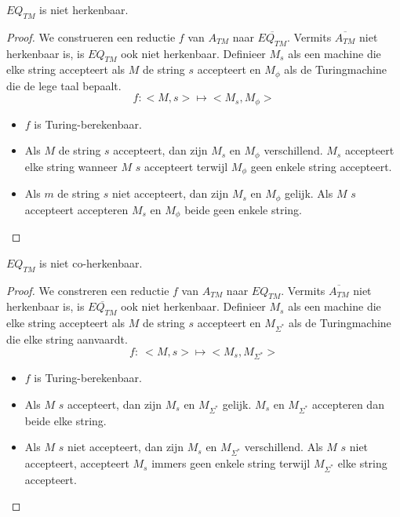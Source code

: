 \documentclass[main.tex]{subfiles}
\begin{document}
\begin{st}
  \label{st:eq-tm-niet-herk}
  $EQ_{TM}$ is niet herkenbaar.

  \begin{proof}
    We construeren een reductie $f$ van $A_{TM}$ naar $\overline{EQ_{TM}}$.
    Vermits $\overline{A_{TM}}$ niet herkenbaar is, is $EQ_{TM}$ ook niet herkenbaar.
    Definieer $M_{s}$ als een machine die elke string accepteert als $M$ de string $s$ accepteert en $M_{\phi}$ als de Turingmachine die de lege taal bepaalt.
    \[ f: <M,s> \mapsto <M_{s},M_{\phi}> \]
    \begin{itemize}
    \item $f$ is Turing-berekenbaar. 
    \item Als $M$ de string $s$ accepteert, dan zijn $M_{s}$ en $M_{\phi}$ verschillend.
      $M_{s}$ accepteert elke string wanneer $M$ $s$ accepteert terwijl $M_{\phi}$ geen enkele string accepteert.
    \item Als $m$ de string $s$ niet accepteert, dan zijn $M_{s}$ en $M_{\phi}$ gelijk.
      Als $M$ $s$ accepteert accepteren $M_{s}$ en $M_{\phi}$ beide geen enkele string.
    \end{itemize}
  \end{proof}
\end{st}

\begin{st}
  \label{st:eq-tm-niet-coherk}
  $EQ_{TM}$ is niet co-herkenbaar.

  \begin{proof}
    We constreren een reductie $f$ van $A_{TM}$ naar $EQ_{TM}$.
    Vermits $\overline{A_{TM}}$ niet herkenbaar is, is $\overline{EQ_{TM}}$ ook niet herkenbaar.
    Definieer $M_{s}$ als een machine die elke string accepteert als $M$ de string $s$ accepteert en $M_{\Sigma^{*}}$ als de Turingmachine die elke string aanvaardt.
    \[ f:\ <M,s> \mapsto <M_{s},M_{\Sigma^{*}}> \]
    \begin{itemize}
    \item $f$ is Turing-berekenbaar. 
    \item Als $M$ $s$ accepteert, dan zijn $M_{s}$ en $M_{\Sigma^{*}}$ gelijk.
      $M_{s}$ en $M_{\Sigma^{*}}$ accepteren dan beide elke string.
    \item Als $M$ $s$ niet accepteert, dan zijn $M_{s}$ en $M_{\Sigma^{*}}$ verschillend.
      Als $M$ $s$ niet accepteert, accepteert $M_{s}$ immers geen enkele string terwijl $M_{\Sigma^{*}}$ elke string accepteert.
    \end{itemize}
  \end{proof}
\end{st}
\end{document}
